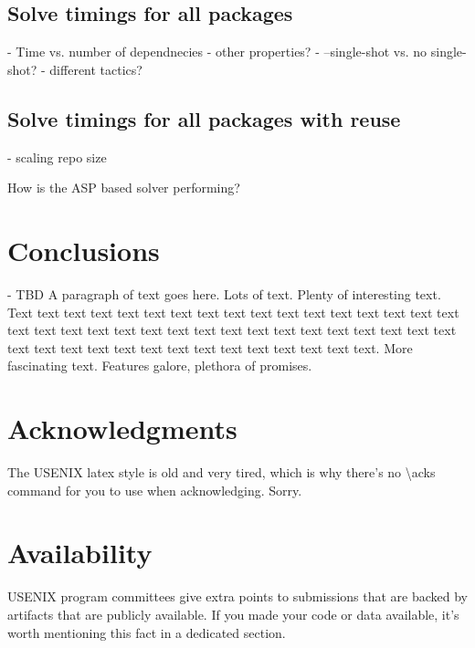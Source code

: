 \subsection{Solve timings for all packages}









- Time vs. number of dependnecies
- other properties?
- --single-shot vs. no single-shot?
- different tactics?

\subsection{Solve timings for all packages with reuse}
- scaling repo size


How is the ASP based solver performing?

\section{Conclusions}
- TBD
A paragraph of text goes here. Lots of text. Plenty of interesting
text. Text text text text text text text text text text text text text
text text text text text text text text text text text text text text
text text text text text text text text text text text text text text
text text text text text text text.
More fascinating text. Features galore, plethora of promises.

\section*{Acknowledgments}
The USENIX latex style is old and very tired, which is why
there's no \textbackslash{}acks command for you to use when
acknowledging. Sorry.

\section*{Availability}

USENIX program committees give extra points to submissions that are
backed by artifacts that are publicly available. If you made your code
or data available, it's worth mentioning this fact in a dedicated
section.

